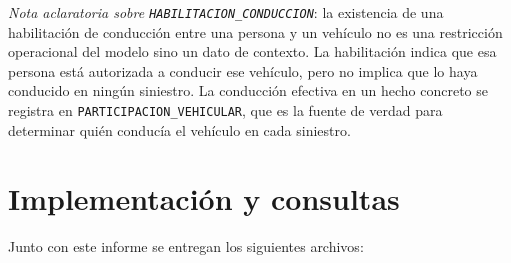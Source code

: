 \documentclass[12pt,a4paper]{article}
\begin{document}
\textit{Nota aclaratoria sobre \texttt{HABILITACION\_CONDUCCION}}: la existencia de una habilitación de conducción entre una persona y un vehículo no es una restricción operacional del modelo sino un dato de contexto. La habilitación indica que esa persona está autorizada a conducir ese vehículo, pero no implica que lo haya conducido en ningún siniestro. La conducción efectiva en un hecho concreto se registra en \texttt{PARTICIPACION\_VEHICULAR}, que es la fuente de verdad para determinar quién conducía el vehículo en cada siniestro.

\section{Implementación y consultas}

Junto con este informe se entregan los siguientes archivos:
\end{document}
